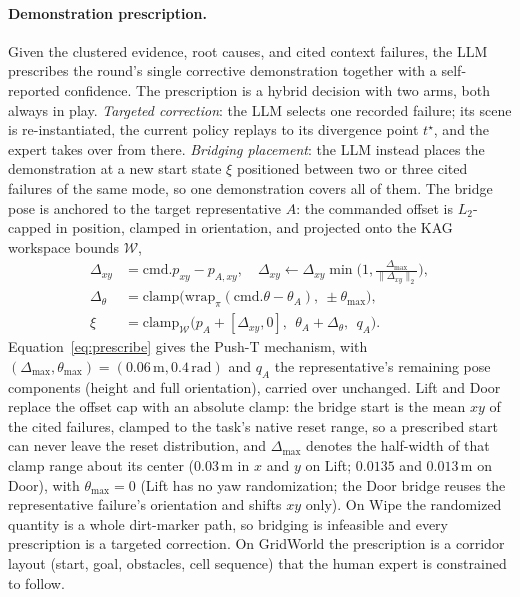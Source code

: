 \documentclass[letterpaper]{article} %
\begin{document}
\paragraph{Demonstration prescription.}
Given the clustered evidence, root causes, and cited context failures, the
LLM prescribes the round's single corrective demonstration together with a
self-reported confidence. The prescription is a hybrid decision with two
arms, both always in play. \emph{Targeted correction}: the LLM selects one
recorded failure; its scene is re-instantiated, the current policy replays to
its divergence point $t^\star$, and the expert takes over from there.
\emph{Bridging placement}: the LLM instead places the demonstration at
a new start state $\xi$ positioned between two or three cited failures of the
same mode, so one demonstration covers all of them. The bridge pose is
anchored to the target representative $A$: the commanded offset is
$L_2$-capped in position, clamped in orientation, and projected onto the KAG
workspace bounds $\mathcal{W}$,
\begin{align}
\Delta_{xy}&=\mathrm{cmd}.p_{xy}-p_{A,xy},
\quad
\Delta_{xy}\leftarrow
\Delta_{xy}\min\!\Big(1,\tfrac{\Delta_{\max}}{\|\Delta_{xy}\|_2}\Big),
\nonumber\\
\Delta_{\theta}&=\mathrm{clamp}\big(
\mathrm{wrap}_{\pi}(\mathrm{cmd}.\theta-\theta_A),\ \pm\theta_{\max}\big),
\nonumber\\
\xi&=\mathrm{clamp}_{\mathcal{W}}\big(
p_A+[\Delta_{xy},0],\ \ \theta_A+\Delta_{\theta},\ \ q_A\big).
\label{eq:prescribe}
\end{align}
Equation~\ref{eq:prescribe} gives the Push-T mechanism, with
$(\Delta_{\max},\theta_{\max})=(0.06\,\mathrm{m},0.4\,\mathrm{rad})$ and
$q_A$ the representative's remaining pose components (height and full
orientation), carried over unchanged. Lift
and Door replace the offset cap with an absolute clamp: the bridge start is
the mean $xy$ of the cited failures, clamped to the task's native reset
range, so a prescribed start can never leave the reset distribution, and
$\Delta_{\max}$ denotes the half-width of that clamp range about its center
($0.03$\,m in $x$ and $y$ on Lift; $0.0135$ and $0.013$\,m on Door), with
$\theta_{\max}=0$ (Lift has no yaw randomization; the Door bridge reuses
the representative failure's orientation and shifts $xy$ only). On Wipe
the randomized quantity is a whole dirt-marker path, so bridging is
infeasible and every prescription is a targeted correction. On GridWorld the
prescription is a corridor layout (start, goal, obstacles, cell sequence)
that the human expert is constrained to follow.
\end{document}
